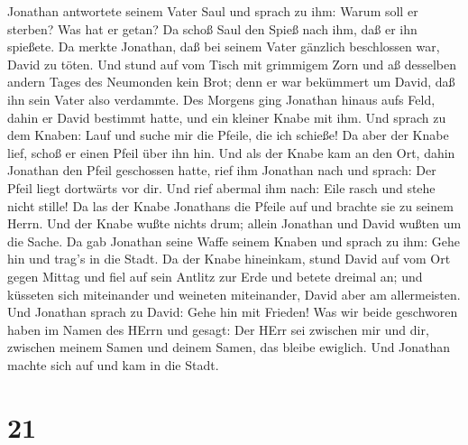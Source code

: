  Jonathan antwortete seinem Vater Saul und sprach zu ihm:
Warum soll er sterben? Was hat er getan?  Da schoß Saul den
Spieß nach ihm, daß er ihn spießete. Da merkte Jonathan, daß bei seinem
Vater gänzlich beschlossen war, David zu töten.  Und stund
auf vom Tisch mit grimmigem Zorn und aß desselben andern Tages des
Neumonden kein Brot; denn er war bekümmert um David, daß ihn sein Vater
also verdammte.  Des Morgens ging Jonathan hinaus aufs
Feld, dahin er David bestimmt hatte, und ein kleiner Knabe mit ihm.
 Und sprach zu dem Knaben: Lauf und suche mir die Pfeile,
die ich schieße! Da aber der Knabe lief, schoß er einen Pfeil über ihn
hin.  Und als der Knabe kam an den Ort, dahin Jonathan den
Pfeil geschossen hatte, rief ihm Jonathan nach und sprach: Der Pfeil
liegt dortwärts vor dir.  Und rief abermal ihm nach: Eile
rasch und stehe nicht stille! Da las der Knabe Jonathans die Pfeile auf
und brachte sie zu seinem Herrn.  Und der Knabe wußte
nichts drum; allein Jonathan und David wußten um die Sache.
 Da gab Jonathan seine Waffe seinem Knaben und sprach zu
ihm: Gehe hin und trag's in die Stadt.  Da der Knabe
hineinkam, stund David auf vom Ort gegen Mittag und fiel auf sein
Antlitz zur Erde und betete dreimal an; und küsseten sich miteinander
und weineten miteinander, David aber am allermeisten.  Und
Jonathan sprach zu David: Gehe hin mit Frieden! Was wir beide geschworen
haben im Namen des HErrn und gesagt: Der HErr sei zwischen mir und dir,
zwischen meinem Samen und deinem Samen, das bleibe ewiglich.
 Und Jonathan machte sich auf und kam in die Stadt.

\hypertarget{section-20}{%
\section{21}\label{section-20}}

